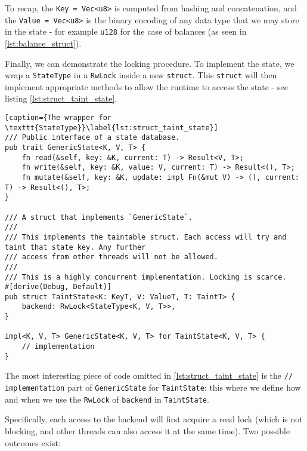 To recap, the \texttt{Key = Vec<u8>} is computed from hashing and concatenation, and the
\texttt{Value = Vec<u8>} is the binary encoding of any data type that we may store in the state -
for example \texttt{u128} for the case of balances (as seen in \ref{lst:balance_struct}).

Finally, we can demonstrate the locking procedure. To implement the state, we wrap a
\texttt{StateType} in a \texttt{RwLock} inside a new \texttt{struct}. This \texttt{struct} will then
implement appropriate methods to allow the runtime to access the state - see listing
\ref{lst:struct_taint_state}.

\begin{lstlisting}[caption={The wrapper for \texttt{StateType}}\label{lst:struct_taint_state}]
/// Public interface of a state database.
pub trait GenericState<K, V, T> {
    fn read(&self, key: &K, current: T) -> Result<V, T>;
    fn write(&self, key: &K, value: V, current: T) -> Result<(), T>;
    fn mutate(&self, key: &K, update: impl Fn(&mut V) -> (), current: T) -> Result<(), T>;
}

/// A struct that implements `GenericState`.
///
/// This implements the taintable struct. Each access will try and taint that state key. Any further
/// access from other threads will not be allowed.
///
/// This is a highly concurrent implementation. Locking is scarce.
#[derive(Debug, Default)]
pub struct TaintState<K: KeyT, V: ValueT, T: TaintT> {
    backend: RwLock<StateType<K, V, T>>,
}

impl<K, V, T> GenericState<K, V, T> for TaintState<K, V, T> {
    // implementation
}
\end{lstlisting}

The most interesting piece of code omitted in \ref{lst:struct_taint_state} is the \texttt{//
implementation} part of \texttt{GenericState} for \texttt{TaintState}: this where we define how and
when we use the \texttt{RwLock} of \texttt{backend} in \texttt{TaintState}.

Specifically, each access to the backend will first acquire a read lock (which is not blocking, and
other threads can also access it at the same time). Two possible outcomes exist:

